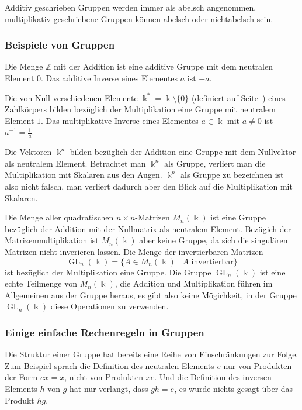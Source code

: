 Additiv geschrieben Gruppen werden immer als abelsch angenommen,
multiplikativ geschriebene Gruppen können abelsch oder nichtabelsch sein.

\subsubsection{Beispiele von Gruppen}

\begin{beispiel}
Die Menge $\mathbb{Z}$ mit der Addition ist eine additive Gruppe mit
dem neutralen Element $0$.
Das additive Inverse eines Elementes $a$ ist $-a$.
\end{beispiel}

\begin{beispiel}
Die von Null verschiedenen Elemente $\Bbbk^*=\Bbbk\setminus\{0\}$ (definiert
auf Seite~\pageref{buch:zahlen:def:bbbk*})
eines Zahlkörpers bilden
bezüglich der Multiplikation eine Gruppe mit neutralem Element $1$.
Das multiplikative Inverse eines Elementes $a\in \Bbbk$ mit $a\ne 0$
ist $a^{-1}=\frac1{a}$.
\end{beispiel}

\begin{beispiel}
Die Vektoren $\Bbbk^n$ bilden bezüglich der Addition eine Gruppe mit
dem Nullvektor als neutralem Element.
Betrachtet man $\Bbbk^n$ als Gruppe, verliert man die Multiplikation
mit Skalaren aus den Augen.
$\Bbbk^n$ als Gruppe zu bezeichnen ist also nicht falsch, man
verliert dadurch aber den Blick auf die Multiplikation mit Skalaren.
\end{beispiel}

\begin{beispiel}
Die Menge aller quadratischen $n\times n$-Matrizen $M_n(\Bbbk)$ ist
eine Gruppe bezüglich der Addition mit der Nullmatrix als neutralem
Element.
Bezügich der Matrizenmultiplikation ist $M_n(\Bbbk)$ aber keine
Gruppe, da sich die singulären Matrizen nicht inverieren lassen.
Die Menge der invertierbaren Matrizen
\[
\operatorname{GL}_n(\Bbbk)
=
\{
A\in M_n(\Bbbk) \mid \text{$A$ invertierbar}
\}
\]
ist bezüglich der Multiplikation eine Gruppe.
Die Gruppe $\operatorname{GL}_n(\Bbbk)$ ist eine echte Teilmenge 
von $M_n(\Bbbk)$, die Addition und Multiplikation führen im Allgemeinen
aus der Gruppe heraus, es gibt also keine Mögichkeit, in der Gruppe
$\operatorname{GL}_n(\Bbbk)$ diese Operationen zu verwenden.
\end{beispiel}

\subsubsection{Einige einfache Rechenregeln in Gruppen}
Die Struktur einer Gruppe hat bereits eine Reihe von
Einschränkungen zur Folge.
Zum Beispiel sprach die Definition des neutralen Elements $e$ nur von
Produkten der Form $ex=x$, nicht von Produkten $xe$.
Und die Definition des inversen Elements $h$ von $g$ hat nur
verlangt, dass $gh=e$, es wurde nichts gesagt über das Produkt $hg$.

